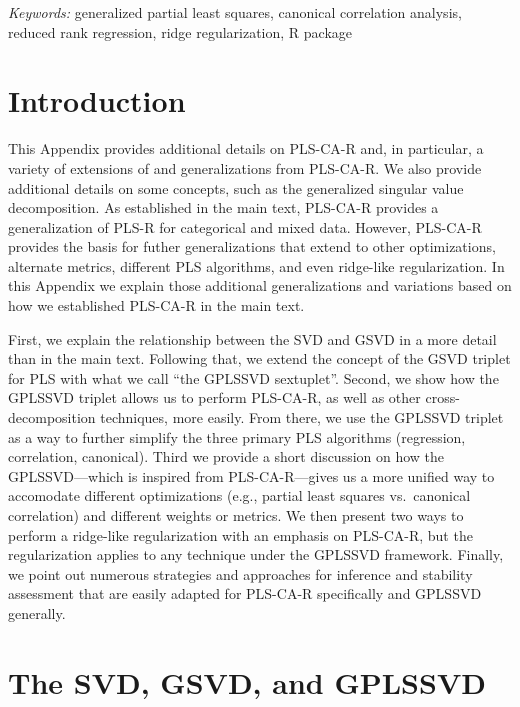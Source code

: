 \documentclass[12pt]{article}
\begin{document}
\noindent%
{\it Keywords:} generalized partial least squares, canonical correlation analysis, reduced rank regression, ridge regularization, R package
\vfill

\newpage
{} %

\hypertarget{introduction}{%
\section{Introduction}\label{introduction}}

This Appendix provides additional details on PLS-CA-R and, in
particular, a variety of extensions of and generalizations from
PLS-CA-R. We also provide additional details on some concepts, such as
the generalized singular value decomposition. As established in the main
text, PLS-CA-R provides a generalization of PLS-R for categorical and
mixed data. However, PLS-CA-R provides the basis for futher
generalizations that extend to other optimizations, alternate metrics,
different PLS algorithms, and even ridge-like regularization. In this
Appendix we explain those additional generalizations and variations
based on how we established PLS-CA-R in the main text.

First, we explain the relationship between the SVD and GSVD in a more
detail than in the main text. Following that, we extend the concept of
the GSVD triplet for PLS with what we call ``the GPLSSVD sextuplet''.
Second, we show how the GPLSSVD triplet allows us to perform PLS-CA-R,
as well as other cross-decomposition techniques, more easily. From
there, we use the GPLSSVD triplet as a way to further simplify the three
primary PLS algorithms (regression, correlation, canonical). Third we
provide a short discussion on how the GPLSSVD---which is inspired from
PLS-CA-R---gives us a more unified way to accomodate different
optimizations (e.g., partial least squares vs.~canonical correlation)
and different weights or metrics. We then present two ways to perform a
ridge-like regularization with an emphasis on PLS-CA-R, but the
regularization applies to any technique under the GPLSSVD framework.
Finally, we point out numerous strategies and approaches for inference
and stability assessment that are easily adapted for PLS-CA-R
specifically and GPLSSVD generally.

\hypertarget{the-svd-gsvd-and-gplssvd}{%
\section{The SVD, GSVD, and GPLSSVD}\label{the-svd-gsvd-and-gplssvd}}
\end{document}
